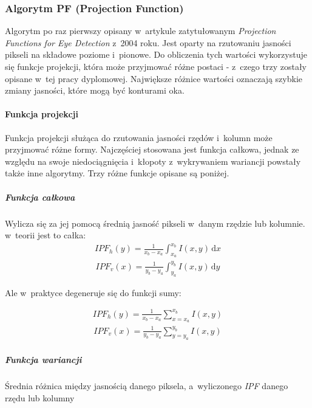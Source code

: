 








\subsubsection{Algorytm PF (Projection Function)}

Algorytm po raz pierwszy opisany w~artykule zatytułowanym \textit{Projection Functions for Eye Detection} \cite{projection_function} z~2004 roku. Jest oparty na rzutowaniu jasności pikseli na składowe poziome i~pionowe. Do obliczenia tych wartości wykorzystuje się funkcje projekcji, która może przyjmować różne postaci - z~czego trzy zostały opisane w~tej pracy dyplomowej. Największe różnice wartości oznaczają szybkie zmiany jasności, które mogą być konturami oka.~\cite{EyePupilWebCam}

\paragraph{Funkcja projekcji}

Funkcja projekcji służąca do rzutowania jasności rzędów i~kolumn może przyjmować różne formy. Najczęściej stosowana jest funkcja całkowa, jednak ze względu na swoje niedociągnięcia i~kłopoty z~wykrywaniem wariancji powstały także inne algorytmy. Trzy różne funkcje opisane są poniżej.

\subparagraph{Funkcja całkowa} Wylicza się za jej pomocą średnią jasność pikseli w~danym rzędzie lub kolumnie. w~teorii jest to całka:
\begin{align}
    {IPF_h}(y) = \frac{1}{{x_b}-{x_a}}\int_{x_a}^{x_b} I(x,y) \, \mathrm{d}x
\end{align}
\begin{align}
    {IPF_v}(x) = \frac{1}{{y_b}-{y_a}}\int_{y_a}^{y_b} I(x,y) \, \mathrm{d}y
\end{align}

Ale w~praktyce degeneruje się do funkcji sumy:

\begin{align}
    {IPF_h}(y)=\frac{1}{{x_b}-{x_a}}\sum_{x={x_a}}^{{x_b}} I(x,y)
\end{align}
\begin{align}
    {IPF_v}(x)=\frac{1}{{y_b}-{y_a}}\sum_{y={y_a}}^{{y_b}} I(x,y)
\end{align}

\subparagraph{Funkcja wariancji} Średnia różnica między jasnością danego piksela, a~wyliczonego \textit{IPF} danego rzędu lub kolumny

